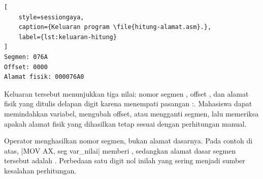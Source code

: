 \begin{lstlisting}[
    style=sessiongaya,
    caption={Keluaran program \file{hitung-alamat.asm}.},
    label={lst:keluaran-hitung}
]
Segmen: 076A
Offset: 0000
Alamat fisik: 000076A0
\end{lstlisting}

Keluaran tersebut menunjukkan tiga nilai: nomor segmen ,
offset , dan alamat fisik  yang ditulis delapan
digit karena menempati pasangan :. Mahasiswa dapat
memindahkan variabel, mengubah offset, atau mengganti segmen, lalu
memeriksa apakah alamat fisik yang dihasilkan tetap sesuai dengan
perhitungan manual.

\begin{infobox}
\vspace{1.1em}
Operator  menghasilkan nomor segmen, bukan alamat dasarnya.
Pada contoh di atas, \lstasm|MOV AX, seg var_nilai| memberi
, sedangkan alamat dasar segmen tersebut adalah
. Perbedaan satu digit nol inilah yang sering menjadi
sumber kesalahan perhitungan.
\end{infobox}
